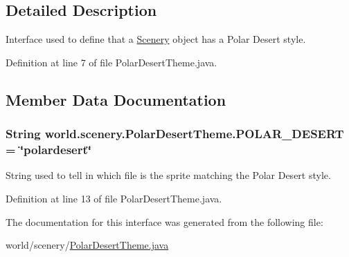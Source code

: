 \subsection{Detailed Description}
Interface used to define that a \hyperlink{a00024}{Scenery} object has a Polar Desert style. 

Definition at line 7 of file Polar\-Desert\-Theme.\-java.



\subsection{Member Data Documentation}
\hypertarget{a00019_a48dd1801e0146ea2306dadcbdee81b77}{
\subsubsection[{P\-O\-L\-A\-R\-\_\-\-D\-E\-S\-E\-R\-T}]{\setlength{\rightskip}{0pt plus 5cm}String world.\-scenery.\-Polar\-Desert\-Theme.\-P\-O\-L\-A\-R\-\_\-\-D\-E\-S\-E\-R\-T = \char`\"{}polardesert\char`\"{}\hspace{0.3cm}{\ttfamily [static]}}}\label{a00019_a48dd1801e0146ea2306dadcbdee81b77}


String used to tell in which file is the sprite matching the Polar Desert style. 



Definition at line 13 of file Polar\-Desert\-Theme.\-java.



The documentation for this interface was generated from the following file\-:\begin{DoxyCompactItemize}
\item 
world/scenery/\hyperlink{a00067}{Polar\-Desert\-Theme.\-java}\end{DoxyCompactItemize}

